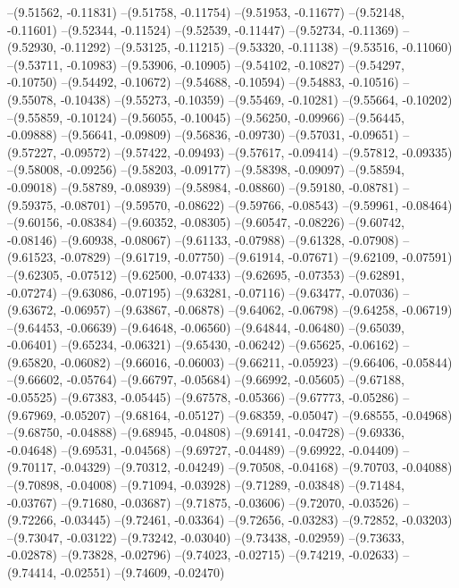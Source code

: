 --(9.51562, -0.11831)
--(9.51758, -0.11754)
--(9.51953, -0.11677)
--(9.52148, -0.11601)
--(9.52344, -0.11524)
--(9.52539, -0.11447)
--(9.52734, -0.11369)
--(9.52930, -0.11292)
--(9.53125, -0.11215)
--(9.53320, -0.11138)
--(9.53516, -0.11060)
--(9.53711, -0.10983)
--(9.53906, -0.10905)
--(9.54102, -0.10827)
--(9.54297, -0.10750)
--(9.54492, -0.10672)
--(9.54688, -0.10594)
--(9.54883, -0.10516)
--(9.55078, -0.10438)
--(9.55273, -0.10359)
--(9.55469, -0.10281)
--(9.55664, -0.10202)
--(9.55859, -0.10124)
--(9.56055, -0.10045)
--(9.56250, -0.09966)
--(9.56445, -0.09888)
--(9.56641, -0.09809)
--(9.56836, -0.09730)
--(9.57031, -0.09651)
--(9.57227, -0.09572)
--(9.57422, -0.09493)
--(9.57617, -0.09414)
--(9.57812, -0.09335)
--(9.58008, -0.09256)
--(9.58203, -0.09177)
--(9.58398, -0.09097)
--(9.58594, -0.09018)
--(9.58789, -0.08939)
--(9.58984, -0.08860)
--(9.59180, -0.08781)
--(9.59375, -0.08701)
--(9.59570, -0.08622)
--(9.59766, -0.08543)
--(9.59961, -0.08464)
--(9.60156, -0.08384)
--(9.60352, -0.08305)
--(9.60547, -0.08226)
--(9.60742, -0.08146)
--(9.60938, -0.08067)
--(9.61133, -0.07988)
--(9.61328, -0.07908)
--(9.61523, -0.07829)
--(9.61719, -0.07750)
--(9.61914, -0.07671)
--(9.62109, -0.07591)
--(9.62305, -0.07512)
--(9.62500, -0.07433)
--(9.62695, -0.07353)
--(9.62891, -0.07274)
--(9.63086, -0.07195)
--(9.63281, -0.07116)
--(9.63477, -0.07036)
--(9.63672, -0.06957)
--(9.63867, -0.06878)
--(9.64062, -0.06798)
--(9.64258, -0.06719)
--(9.64453, -0.06639)
--(9.64648, -0.06560)
--(9.64844, -0.06480)
--(9.65039, -0.06401)
--(9.65234, -0.06321)
--(9.65430, -0.06242)
--(9.65625, -0.06162)
--(9.65820, -0.06082)
--(9.66016, -0.06003)
--(9.66211, -0.05923)
--(9.66406, -0.05844)
--(9.66602, -0.05764)
--(9.66797, -0.05684)
--(9.66992, -0.05605)
--(9.67188, -0.05525)
--(9.67383, -0.05445)
--(9.67578, -0.05366)
--(9.67773, -0.05286)
--(9.67969, -0.05207)
--(9.68164, -0.05127)
--(9.68359, -0.05047)
--(9.68555, -0.04968)
--(9.68750, -0.04888)
--(9.68945, -0.04808)
--(9.69141, -0.04728)
--(9.69336, -0.04648)
--(9.69531, -0.04568)
--(9.69727, -0.04489)
--(9.69922, -0.04409)
--(9.70117, -0.04329)
--(9.70312, -0.04249)
--(9.70508, -0.04168)
--(9.70703, -0.04088)
--(9.70898, -0.04008)
--(9.71094, -0.03928)
--(9.71289, -0.03848)
--(9.71484, -0.03767)
--(9.71680, -0.03687)
--(9.71875, -0.03606)
--(9.72070, -0.03526)
--(9.72266, -0.03445)
--(9.72461, -0.03364)
--(9.72656, -0.03283)
--(9.72852, -0.03203)
--(9.73047, -0.03122)
--(9.73242, -0.03040)
--(9.73438, -0.02959)
--(9.73633, -0.02878)
--(9.73828, -0.02796)
--(9.74023, -0.02715)
--(9.74219, -0.02633)
--(9.74414, -0.02551)
--(9.74609, -0.02470)
